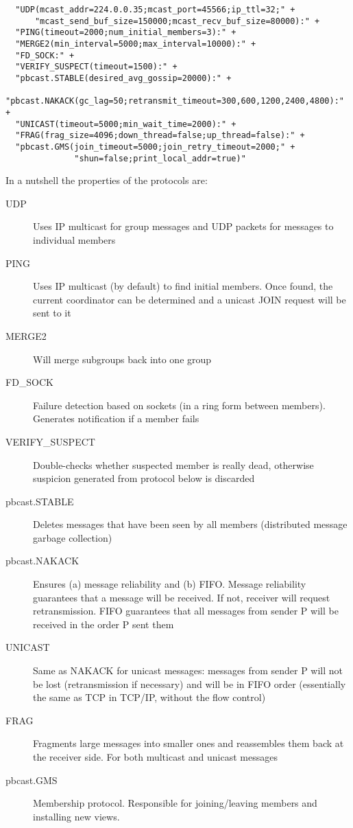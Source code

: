   \begin{small}
  \begin{verbatim}
  "UDP(mcast_addr=224.0.0.35;mcast_port=45566;ip_ttl=32;" +
      "mcast_send_buf_size=150000;mcast_recv_buf_size=80000):" +
  "PING(timeout=2000;num_initial_members=3):" +
  "MERGE2(min_interval=5000;max_interval=10000):" +
  "FD_SOCK:" +
  "VERIFY_SUSPECT(timeout=1500):" +
  "pbcast.STABLE(desired_avg_gossip=20000):" +
  "pbcast.NAKACK(gc_lag=50;retransmit_timeout=300,600,1200,2400,4800):" +
  "UNICAST(timeout=5000;min_wait_time=2000):" +
  "FRAG(frag_size=4096;down_thread=false;up_thread=false):" +
  "pbcast.GMS(join_timeout=5000;join_retry_timeout=2000;" +
              "shun=false;print_local_addr=true)"
  \end{verbatim}
  \end{small}

  In a nutshell the properties of the protocols are:

  \begin{description}
  \item[UDP] Uses IP multicast for group messages and UDP packets for messages to
             individual members
  \item[PING] Uses IP multicast (by default) to find initial members. Once found, the
              current coordinator can be determined and a unicast JOIN request will
              be sent to it
  \item[MERGE2] Will merge subgroups back into one group
  \item[FD\_SOCK] Failure detection based on sockets (in a ring form between
                  members). Generates notification if a member fails
  \item[VERIFY\_SUSPECT] Double-checks whether suspected member is really dead,
                         otherwise suspicion generated from protocol below is discarded
  \item[pbcast.STABLE] Deletes messages that have been seen by all members
                       (distributed message garbage collection)
  \item[pbcast.NAKACK] Ensures (a) message reliability and (b) FIFO. Message
                       reliability guarantees that a message will be received. If
                       not, receiver will request retransmission. FIFO guarantees
                       that all messages from sender P will be received in
                       the order P sent them
  \item[UNICAST] Same as NAKACK for unicast messages: messages from sender P will not
                 be lost (retransmission if necessary) and will be in FIFO order
                (essentially the same as TCP in TCP/IP, without the flow control)
  \item[FRAG] Fragments large messages into smaller ones and reassembles them back at
              the receiver side. For both multicast and unicast messages
  \item[pbcast.GMS] Membership protocol. Responsible for joining/leaving members and
                    installing new views. 
  \end{description}



